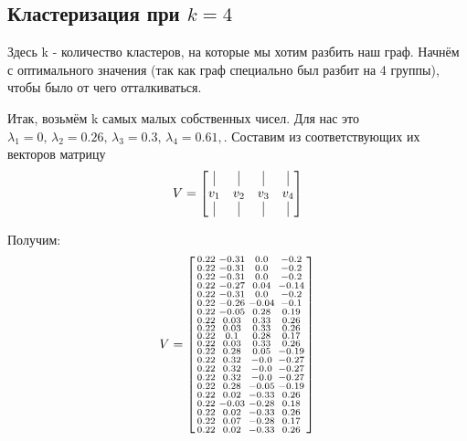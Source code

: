 \documentclass[a4paper,hidelinks,14pt]{extarticle}
\begin{document}
	\subsection{Кластеризация при $k=4$}
	Здесь k - количество кластеров, на которые мы хотим разбить наш граф. Начнём с оптимального значения (так как граф специально был разбит на 4 группы), чтобы было от чего отталкиваться.
	
	Итак, возьмём k самых малых собственных чисел. Для нас это $	\lambda_1=0,\, \lambda_2=0.26,\, \lambda_3=0.3,\, \lambda_4=0.61,$. Составим из соответствующих их векторов матрицу
	$$
	V = \begin{bmatrix}
		\vline & \vline & \vline & \vline \\
		v_1 & v_2 & v_3 & v_4 \\
		\vline & \vline & \vline & \vline \\
	\end{bmatrix}
	$$
	
	Получим:
	$$V=\begin{bsmallmatrix}
		0.22 & -0.31 & 0.0 &		-0.2 \\
		0.22 &		-0.31 & 0.0 &		-0.2 \\
		0.22&		-0.31 & 0.0 &		-0.2 \\
		0.22&		-0.27 & 0.04 &		-0.14 \\
		0.22&		-0.31 & 0.0 &		-0.2  \\
		0.22&		-0.26 & -0.04 &		-0.1 \\
		0.22&		-0.05 & 0.28 &		0.19 \\
		0.22&		0.03 & 0.33  &		0.26 \\
		0.22&		0.03 & 0.33  &		0.26 \\
		0.22&		0.1 & 0.28  &		0.17 \\
		0.22&		0.03 & 0.33  &		0.26 \\
		0.22&		0.28 & 0.05  &		-0.19  \\
		0.22&		0.32 & -0.0  &		-0.27  \\
		0.22&		0.32 & -0.0  &		-0.27  \\
		0.22&		0.32 & -0.0  &		-0.27  \\
		0.22&		0.28 & -0.05  &		-0.19 \\
		0.22&		0.02 & -0.33  &		0.26 \\
		0.22&		-0.03 & -0.28 &		0.18 \\
		0.22&		0.02 & -0.33  &		0.26 \\
		0.22&		0.07 & -0.28  &		0.17 \\
		0.22&		0.02 & -0.33  &		0.26 \\
	\end{bsmallmatrix}
	$$
	
\end{document}
